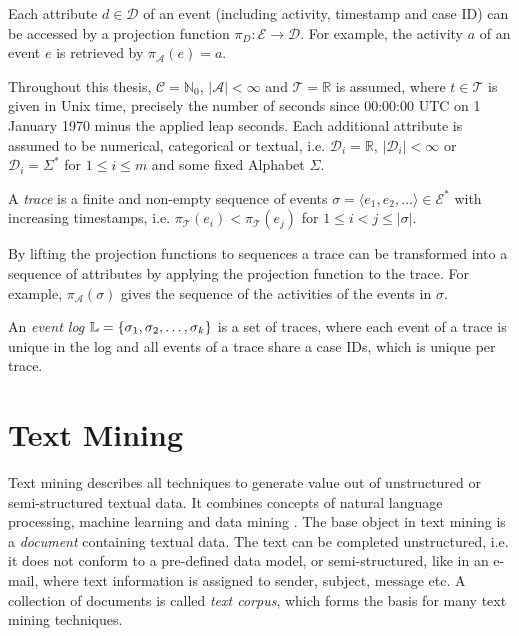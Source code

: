 Each attribute $d \in \mathcal{D}$ of an event (including activity, timestamp and case ID) can be accessed by a projection function $\pi_D \colon \mathcal{E} \to \mathcal{D}$.
For example, the activity $a$ of an event $e$ is retrieved by $\pi_\mathcal{A}(e) = a$.

Throughout this thesis,  $\mathcal{C} = \mathbb{N}_0$, $|\mathcal{A}| < \infty$ and $ \mathcal{T} = \mathbb{R}$ is assumed, where $t \in \mathcal{T}$ is given in Unix time, precisely the number of seconds since 00:00:00 UTC on 1 January 1970 minus the applied leap seconds.
Each additional attribute is assumed to be numerical, categorical or textual, i.e. $\mathcal{D}_i = \mathbb{R}$, $|\mathcal{D}_i| < \infty$ or $\mathcal{D}_i = \Sigma^\ast$  for $1 \leq i \leq m$ and some fixed Alphabet $\Sigma$.

\begin{definition}[Trace]
	A \textit{trace} is a finite and non-empty sequence of events $\sigma = \langle e_1, e_2, \dots\rangle \in  \mathcal{E}^\ast$ with increasing timestamps, i.e. $\pi_\mathcal{T} (e_i) < \pi_\mathcal{T} (e_j) $ for $1 \leq i < j \leq |\sigma|$.
\end{definition}


By lifting the projection functions to sequences a trace can be transformed into a sequence of attributes by applying the projection function to the trace.
For example, $\pi_\mathcal{A}(\sigma)$ gives the sequence of the activities of the events in $\sigma$.

\begin{definition}
	An \textit{event log} $\mathbb{L} = \{ \sigma_1, \sigma _2, \dots, \sigma_k \}$ is a set of traces, where each event of a trace is unique in the log and all events of a trace share a case IDs, which is unique per trace.
\end{definition}

\section{Text Mining}

Text mining describes all techniques to generate value out of unstructured or semi-structured textual data.
It combines concepts of natural language processing, machine learning and data mining \cite{DBLP:journals/coling/Mihalcea08}.
The base object in text mining is a \textit{document} containing textual data.
The text can be completed unstructured, i.e. it does not conform to a pre-defined data model, or semi-structured, like in an e-mail, where text information is assigned to sender, subject, message etc.
A collection of documents is called \textit{text corpus}, which forms the basis for many text mining techniques.

